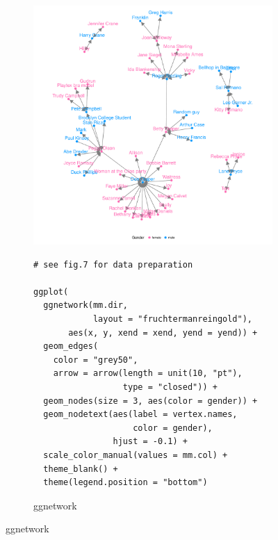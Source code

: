 \begin{figure}[hbtp]
\begin{subfigure}[t]{\textwidth}
\begin{adjustbox}{valign=t}
\begin{minipage}{.49\textwidth}
\includegraphics[width=\textwidth]{figure/madmen2_geom_net-1.pdf}

                          \end{minipage}

                          \end{adjustbox}
\end{subfigure}
%
\begin{subfigure}[t]{\textwidth}
\caption{ggnetwork \label{mm2:ggnetwork}}
\vspace{1em}

             \begin{adjustbox}{valign=t}

             \begin{minipage}{.49\textwidth}
 \begin{knitrout}\footnotesize
{}\color{fgcolor}\begin{kframe}
\begin{verbatim}
# see fig.7 for data preparation

ggplot(
  ggnetwork(mm.dir,
            layout = "fruchtermanreingold"),
       aes(x, y, xend = xend, yend = yend)) +
  geom_edges(
    color = "grey50",
    arrow = arrow(length = unit(10, "pt"),
                  type = "closed")) +
  geom_nodes(size = 3, aes(color = gender)) +
  geom_nodetext(aes(label = vertex.names,
                    color = gender),
                hjust = -0.1) +
  scale_color_manual(values = mm.col) +
  theme_blank() +
  theme(legend.position = "bottom")
\end{verbatim}
\end{kframe}
\end{knitrout} \vspace{1em}


\end{minipage}
\end{adjustbox}
\end{subfigure}
\end{figure}

